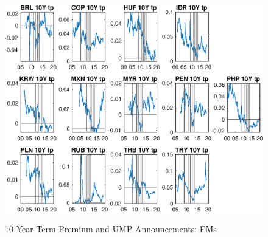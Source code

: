 \documentclass{article}
\begin{document}
\begin{figure}[tbph]
	\begin{center}
		\caption{10-Year Term Premium and UMP Announcements: EMs}
		\label{fig:ssb_tp_QE}
		\includegraphics[trim={0cm 0cm 0cm 0cm},clip,height=1\textheight,width=1.4\textwidth]{../Figures/Estimation/ssb_tp_QE.eps} \\
	\end{center}
\end{figure}
\end{document}
